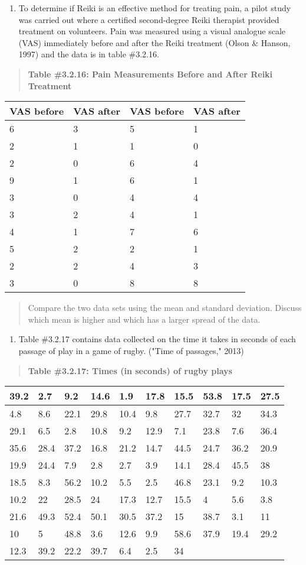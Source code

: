 \documentclass[]{book}
\providecommand{\tightlist}{%
  \setlength{\itemsep}{0pt}\setlength{\parskip}{0pt}}
\begin{document}
\begin{enumerate}
\def\labelenumi{\arabic{enumi}.}
\setcounter{enumi}{9}
\tightlist
\item
  To determine if Reiki is an effective method for treating pain, a
  pilot study was carried out where a certified second-degree Reiki
  therapist provided treatment on volunteers. Pain was measured using
  a visual analogue scale (VAS) immediately before and after the Reiki
  treatment (Olson \& Hanson, 1997) and the data is in table \#3.2.16.
\end{enumerate}

\begin{quote}
\textbf{Table \#3.2.16: Pain Measurements Before and After Reiki Treatment}
\end{quote}

\begin{longtable}[]{@{}llll@{}}
\toprule
VAS before & VAS after & VAS before & VAS after\tabularnewline
\midrule
\endhead
6 & 3 & 5 & 1\tabularnewline
2 & 1 & 1 & 0\tabularnewline
2 & 0 & 6 & 4\tabularnewline
9 & 1 & 6 & 1\tabularnewline
3 & 0 & 4 & 4\tabularnewline
3 & 2 & 4 & 1\tabularnewline
4 & 1 & 7 & 6\tabularnewline
5 & 2 & 2 & 1\tabularnewline
2 & 2 & 4 & 3\tabularnewline
3 & 0 & 8 & 8\tabularnewline
\bottomrule
\end{longtable}

\begin{quote}
Compare the two data sets using the mean and standard deviation.
Discuss which mean is higher and which has a larger spread of the
data.
\end{quote}

\begin{enumerate}
\def\labelenumi{\arabic{enumi}.}
\setcounter{enumi}{10}
\tightlist
\item
  Table \#3.2.17 contains data collected on the time it takes in
  seconds of each passage of play in a game of rugby. ("Time of
  passages," 2013)
\end{enumerate}

\begin{quote}
\textbf{Table \#3.2.17: Times (in seconds) of rugby plays}
\end{quote}

\begin{longtable}[]{@{}llllllllll@{}}
\toprule
39.2 & 2.7 & 9.2 & 14.6 & 1.9 & 17.8 & 15.5 & 53.8 & 17.5 & 27.5\tabularnewline
\midrule
\endhead
4.8 & 8.6 & 22.1 & 29.8 & 10.4 & 9.8 & 27.7 & 32.7 & 32 & 34.3\tabularnewline
29.1 & 6.5 & 2.8 & 10.8 & 9.2 & 12.9 & 7.1 & 23.8 & 7.6 & 36.4\tabularnewline
35.6 & 28.4 & 37.2 & 16.8 & 21.2 & 14.7 & 44.5 & 24.7 & 36.2 & 20.9\tabularnewline
19.9 & 24.4 & 7.9 & 2.8 & 2.7 & 3.9 & 14.1 & 28.4 & 45.5 & 38\tabularnewline
18.5 & 8.3 & 56.2 & 10.2 & 5.5 & 2.5 & 46.8 & 23.1 & 9.2 & 10.3\tabularnewline
10.2 & 22 & 28.5 & 24 & 17.3 & 12.7 & 15.5 & 4 & 5.6 & 3.8\tabularnewline
21.6 & 49.3 & 52.4 & 50.1 & 30.5 & 37.2 & 15 & 38.7 & 3.1 & 11\tabularnewline
10 & 5 & 48.8 & 3.6 & 12.6 & 9.9 & 58.6 & 37.9 & 19.4 & 29.2\tabularnewline
12.3 & 39.2 & 22.2 & 39.7 & 6.4 & 2.5 & 34 & & &\tabularnewline
\bottomrule
\end{longtable}
\end{document}
